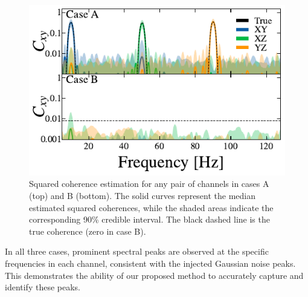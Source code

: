 \documentclass[%
 reprint,
 amsmath,amssymb,
 aps,
 nofootinbib,
]{revtex4-2}
\begin{document}
\begin{figure}
  \includegraphics[width=\columnwidth]{caseAB_coh.pdf}
  \caption{Squared coherence estimation for any pair of channels in cases A (top) and B (bottom). The solid curves represent the median estimated squared coherences, while the shaded areas indicate the corresponding 90\% credible interval. The black dashed line is the true coherence (zero in case B).}
  \label{fig:squared_coh}
\end{figure}


In all three cases, prominent spectral peaks are observed at the specific frequencies in each channel, consistent with the injected Gaussian noise peaks.  
This demonstrates the ability of our proposed method to accurately capture and identify these peaks. 
\end{document}
